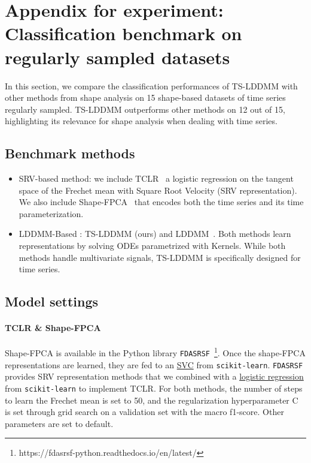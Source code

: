 \section{Appendix for experiment: Classification benchmark on regularly sampled datasets}
\label{appendix: shape_classification}

In this section, we compare the classification performances of TS-LDDMM with other methods from shape analysis on 15 shape-based datasets of time series regularly sampled. TS-LDDMM outperforms other methods on 12 out of 15, highlighting its relevance for shape analysis when dealing with time series. 


\subsection{Benchmark methods}
\begin{itemize}
  \item SRV-based method: we include TCLR~\cite{heo2024logistic} a logistic regression on the tangent space of the Frechet mean with Square Root Velocity (SRV representation). We also include Shape-FPCA~\cite{wu2024shape} that encodes both the time series and its time parameterization. 
  \item LDDMM-Based : TS-LDDMM (ours) and LDDMM~\cite{glaunes2008large}. Both methods learn representations by solving ODEs parametrized with Kernels. While both methods handle multivariate signals, TS-LDDMM is specifically designed for time series.
 \end{itemize}

\subsection{Model settings}

\paragraph{TCLR \& Shape-FPCA}
Shape-FPCA is available in the Python library \texttt{FDASRSF}~\footnote{https://fdasrsf-python.readthedocs.io/en/latest/}. Once the shape-FPCA representations are learned, they are fed to an \href{https://scikit-learn.org/stable/modules/generated/sklearn.svm.SVC.html#sklearn.svm.SVC}{SVC} from \texttt{scikit-learn}. \texttt{FDASRSF} provides SRV representation methods that we combined with a \href{https://scikit-learn.org/stable/modules/generated/sklearn.linear_model.LogisticRegressionCV.html}{logistic regression} from \texttt{scikit-learn} to implement TCLR. For both methods, the number of steps to learn the Frechet mean is set to 50, and the regularization hyperparameter C is set through grid search on a validation set with the macro f1-score. Other parameters are set to default.  

